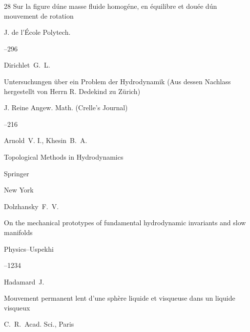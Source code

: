 \begin{thebibliography}{28}
\paper Sur la figure d\'une masse fluide homog\'ene, en \'equilibre et dou\'ee d\'un mouvement de rotation

\jour J. de l'\'Ecole Polytech.



–296




\by Dirichlet~G.~L.

\paper Untersuchungen \"uber ein Problem der Hydrodynamik (Aus dessen Nachlass hergestellt von Herrn R. Dedekind zu Z\"urich)

\jour J. Reine Angew. Math. (Crelle's Journal)



--216




\by Arnold~V. I., Khesin~B.~A.

\book Topological Methods in Hydrodynamics


\publ Springer

\publaddr New York





\by Dolzhansky~F.~V.

\paper On the mechanical prototypes of fundamental hydrodynamic invariants and slow manifolds

\jour Physics–Uspekhi




--1234





\by Hadamard~J.

\paper Mouvement permanent lent d'une sph\`ere liquide et visqueuse dans un liquide visqueux


\jour C.~R.~Acad. Sci., Paris 




\end{thebibliography}
